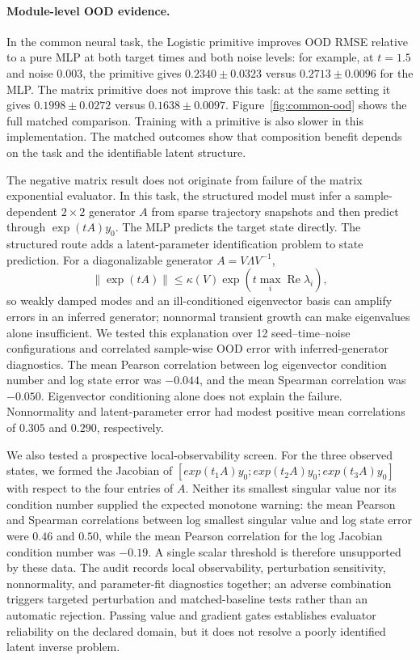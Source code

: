 \documentclass[preprint,12pt,authoryear]{elsarticle}
\begin{document}
\paragraph{Module-level OOD evidence.}
In the common neural task, the Logistic primitive improves OOD RMSE relative to a pure MLP at both target times and both noise levels: for example, at $t=1.5$ and noise $0.003$, the primitive gives $0.2340\pm0.0323$ versus $0.2713\pm0.0096$ for the MLP. The matrix primitive does not improve this task: at the same setting it gives $0.1998\pm0.0272$ versus $0.1638\pm0.0097$. Figure~\ref{fig:common-ood} shows the full matched comparison. Training with a primitive is also slower in this implementation. The matched outcomes show that composition benefit depends on the task and the identifiable latent structure.

The negative matrix result does not originate from failure of the matrix exponential evaluator. In this task, the structured model must infer a sample-dependent $2\times2$ generator $A$ from sparse trajectory snapshots and then predict through $\exp(tA)y_0$. The MLP predicts the target state directly. The structured route adds a latent-parameter identification problem to state prediction. For a diagonalizable generator $A=V\Lambda V^{-1}$,
\begin{equation}
 \|\exp(tA)\|\leq \kappa(V)\exp\!\left(t\max_i\operatorname{Re}\lambda_i\right),
 \label{eq:matrix-sensitivity}
\end{equation}
so weakly damped modes and an ill-conditioned eigenvector basis can amplify errors in an inferred generator; nonnormal transient growth can make eigenvalues alone insufficient. We tested this explanation over 12 seed--time--noise configurations and correlated sample-wise OOD error with inferred-generator diagnostics. The mean Pearson correlation between log eigenvector condition number and log state error was $-0.044$, and the mean Spearman correlation was $-0.050$. Eigenvector conditioning alone does not explain the failure. Nonnormality and latent-parameter error had modest positive mean correlations of $0.305$ and $0.290$, respectively.

We also tested a prospective local-observability screen. For the three observed states, we formed the Jacobian of $[exp(t_1A)y_0;exp(t_2A)y_0;exp(t_3A)y_0]$ with respect to the four entries of $A$. Neither its smallest singular value nor its condition number supplied the expected monotone warning: the mean Pearson and Spearman correlations between log smallest singular value and log state error were $0.46$ and $0.50$, while the mean Pearson correlation for the log Jacobian condition number was $-0.19$. A single scalar threshold is therefore unsupported by these data. The audit records local observability, perturbation sensitivity, nonnormality, and parameter-fit diagnostics together; an adverse combination triggers targeted perturbation and matched-baseline tests rather than an automatic rejection. Passing value and gradient gates establishes evaluator reliability on the declared domain, but it does not resolve a poorly identified latent inverse problem.
\end{document}
